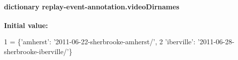 \hypertarget{namespacereplay-event-annotation_a2355d1bf8d72c28fc45e7e864ff43f5f}{
\paragraph[{video\-Dirnames}]{\setlength{\rightskip}{0pt plus 5cm}dictionary replay-\/event-\/annotation.\-video\-Dirnames}}\label{namespacereplay-event-annotation_a2355d1bf8d72c28fc45e7e864ff43f5f}
{\bfseries Initial value\-:}
\begin{DoxyCode}
1 = \{\textcolor{stringliteral}{'amherst'}: \textcolor{stringliteral}{'2011-06-22-sherbrooke-amherst/'},
2                  \textcolor{stringliteral}{'iberville'}: \textcolor{stringliteral}{'2011-06-28-sherbrooke-iberville/'}\}
\end{DoxyCode}
